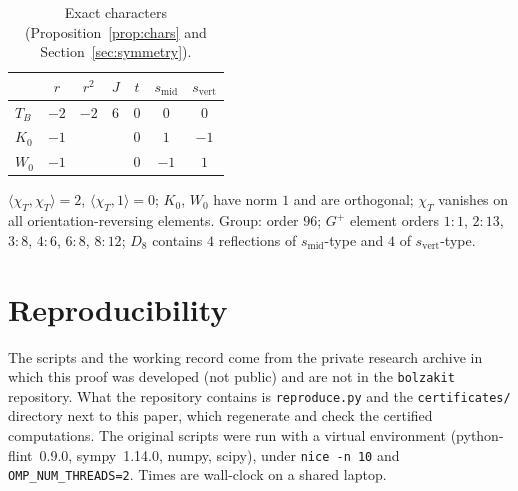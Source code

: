 \documentclass[11pt]{amsart}
\theoremstyle{definition}
\theoremstyle{remark}
\newcommand{\smid}{s_{\mathrm{mid}}}
\newcommand{\svert}{s_{\mathrm{vert}}}
\begin{document}
\begin{table}[!htbp]
\caption{Exact characters (Proposition~\ref{prop:chars} and Section~\ref{sec:symmetry}).}\label{tab:chars}
\small
\begin{tabular}{@{}lcccccc@{}}
\toprule
 & $r$ & $r^2$ & $J$ & $t$ & $\smid$ & $\svert$\\
\midrule
$T_B$ & $-2$ & $-2$ & $6$ & $0$ & $0$ & $0$\\
$K_0$ & $-1$ & & & $0$ & $1$ & $-1$\\
$W_0$ & $-1$ & & & $0$ & $-1$ & $1$\\
\bottomrule
\end{tabular}

\medskip
\parbox{0.9\textwidth}{\footnotesize $\langle\chi_T,\chi_T\rangle=2$, $\langle\chi_T,1\rangle=0$;
$K_0$, $W_0$ have norm $1$ and are orthogonal; $\chi_T$ vanishes on all orientation-reversing
elements. Group: order $96$; $G^+$ element orders $1{:}1$, $2{:}13$, $3{:}8$, $4{:}6$, $6{:}8$, $8{:}12$;
$D_8$ contains $4$ reflections of $\smid$-type and $4$ of $\svert$-type.}
\end{table}

\clearpage
\section{Reproducibility}\label{app:repro}

The scripts and the working record come from the private research archive in which this proof was developed (not
public) and are not in the \texttt{bolzakit} repository. What the repository contains is \texttt{reproduce.py} and the
\texttt{certificates/} directory next to this paper, which regenerate and check the certified computations. The original
scripts were run with a virtual environment (python-flint~0.9.0, sympy~1.14.0, numpy, scipy), under
\texttt{nice -n 10} and \texttt{OMP\_NUM\_THREADS=2}. Times are wall-clock on a shared laptop.
\end{document}
